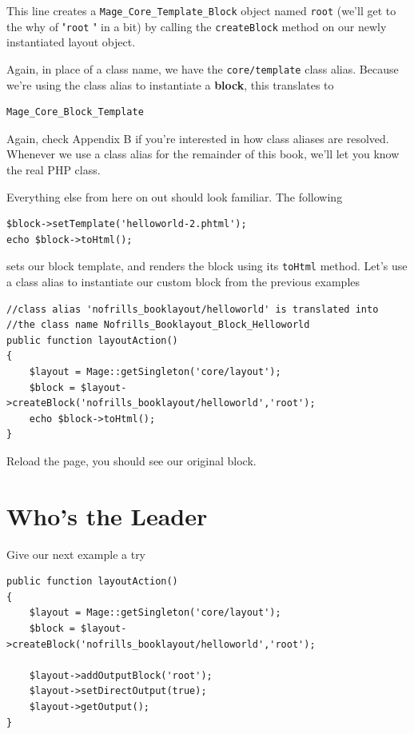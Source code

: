 \documentclass[oneside]{book}
\begin{document}
This line creates a \footnotesize\texttt{Mage\_Core\_Template\_Block} \normalsize  object named \footnotesize\texttt{root} \normalsize  (we'll get to the why of "\footnotesize\texttt{root} \normalsize " in a bit) by calling the \footnotesize\texttt{createBlock} \normalsize  method on our newly instantiated layout object.  

Again, in place of a class name, we have the \footnotesize\texttt{core/template} \normalsize  class alias.  Because we're using the class alias to instantiate a \textbf{block}, this translates to 

\begin{lstlisting}
Mage_Core_Block_Template

\end{lstlisting}


Again, check Appendix B if you're interested in how class aliases are resolved.  Whenever we use a class alias for the remainder of this book, we'll let you know the real PHP class. 

Everything else from here on out should look familiar.  The following

\begin{lstlisting}
$block->setTemplate('helloworld-2.phtml');
echo $block->toHtml();

\end{lstlisting}


sets our block template, and renders the block using its \footnotesize\texttt{toHtml} \normalsize  method.  Let's use a class alias to instantiate our custom block from the previous examples

\begin{lstlisting}
//class alias 'nofrills_booklayout/helloworld' is translated into 
//the class name Nofrills_Booklayout_Block_Helloworld
public function layoutAction()
{
    $layout = Mage::getSingleton('core/layout');                
    $block = $layout->createBlock('nofrills_booklayout/helloworld','root');         
    echo $block->toHtml();
}   

\end{lstlisting}


Reload the page, you should see our original block.

\section{Who's the Leader}

Give our next example a try

\begin{lstlisting}
public function layoutAction()
{
    $layout = Mage::getSingleton('core/layout');                
    $block = $layout->createBlock('nofrills_booklayout/helloworld','root');         

    $layout->addOutputBlock('root');
    $layout->setDirectOutput(true);
    $layout->getOutput();
}

\end{lstlisting}
\end{document}
